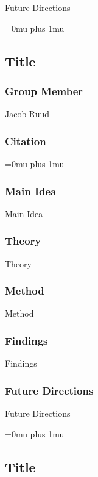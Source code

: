 \noindent
Future Directions 

\Urlmuskip=0mu plus 1mu\relax

\noindent
\subsection{Title}

\subsubsection{Group Member}

\noindent
Jacob Ruud

\noindent
\subsubsection{Citation}

\Urlmuskip=0mu plus 1mu\relax

\subsubsection{Main Idea}

\noindent
Main Idea

\subsubsection{Theory}

\noindent
Theory

\subsubsection{Method}

\noindent
Method

\subsubsection{Findings}

\noindent
Findings

\subsubsection{Future Directions}

\noindent
Future Directions 

\Urlmuskip=0mu plus 1mu\relax

\noindent
\subsection{Title}

